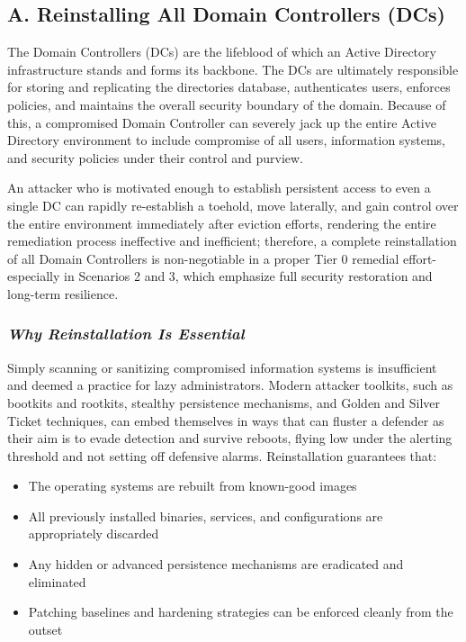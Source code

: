 \subsection{A. Reinstalling All Domain Controllers (DCs)}
The Domain Controllers (DCs) are the lifeblood of which an Active Directory infrastructure stands and forms its backbone. The DCs are ultimately responsible for storing and replicating the directories database, authenticates users, enforces policies, and maintains the overall security boundary of the domain. Because of this, a compromised Domain Controller can severely jack up the entire Active Directory environment to include compromise of all users, information systems, and security policies under their control and purview.

An attacker who is motivated enough to establish persistent access to even a single DC can rapidly re-establish a toehold, move laterally, and gain control over the entire environment immediately after eviction efforts, rendering the entire remediation process ineffective and inefficient; therefore, a complete reinstallation of all Domain Controllers is non-negotiable in a proper Tier 0 remedial effort-especially in Scenarios 2 and 3, which emphasize full security restoration and long-term resilience.

\subsubsection{\textbf{\textit{Why Reinstallation Is Essential}}}
Simply scanning or sanitizing compromised information systems is insufficient and deemed a practice for lazy administrators. Modern attacker toolkits, such as bootkits and rootkits, stealthy persistence mechanisms, and Golden and Silver Ticket techniques, can embed themselves in ways that can fluster a defender as their aim is to evade detection and survive reboots, flying low under the alerting threshold and not setting off defensive alarms. Reinstallation guarantees that:
\begin{itemize}
    \item The operating systems are rebuilt from known-good images
    \item All previously installed binaries, services, and configurations are appropriately discarded
    \item Any hidden or advanced persistence mechanisms are eradicated and eliminated
    \item Patching baselines and hardening strategies can be enforced cleanly from the outset
\end{itemize}

